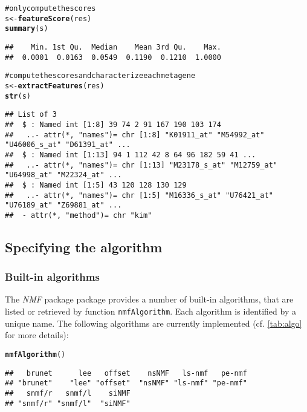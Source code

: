 \documentclass[a4paper]{article}\usepackage{graphicx, color}
\makeatletter
\newcommand{\hlfunctioncall}[1]{\textcolor[rgb]{0.501960784313725,0,0.329411764705882}{\textbf{#1}}}%
\newcommand{\hlcomment}[1]{\textcolor[rgb]{0.180392156862745,0.6,0.341176470588235}{#1}}%
\newenvironment{kframe}{%
 \def\at@end@of@kframe{}%
 \ifinner\ifhmode%
  \def\at@end@of@kframe{\end{minipage}}%
  \begin{minipage}{\columnwidth}%
 \fi\fi%
 \def\FrameCommand##1{\hskip\@totalleftmargin \hskip-\fboxsep
 \colorbox{shadecolor}{##1}\hskip-\fboxsep
     \hskip-\linewidth \hskip-\@totalleftmargin \hskip\columnwidth}%
 \MakeFramed {\advance\hsize-\width
   \@totalleftmargin\z@ \linewidth\hsize
   \@setminipage}}%
 {\par\unskip\endMakeFramed%
 \at@end@of@kframe}
\newenvironment{knitrout}{}{} %
\let\code=\texttt
\newcommand{\pkgname}[1]{\textit{#1}\xspace}
\newcommand{\Rpkg}[1]{\pkgname{#1} package\xspace}
\newcommand{\nmfpack}{\Rpkg{NMF}}
\makeatother
\begin{document}
\begin{knitrout}
\color{fgcolor}\begin{kframe}
\begin{alltt}
\hlcomment{# only compute the scores}
s <- \hlfunctioncall{featureScore}(res)
\hlfunctioncall{summary}(s)
\end{alltt}
\begin{verbatim}
##    Min. 1st Qu.  Median    Mean 3rd Qu.    Max. 
##  0.0001  0.0163  0.0549  0.1190  0.1210  1.0000
\end{verbatim}
\begin{alltt}

\hlcomment{# compute the scores and characterize each metagene}
s <- \hlfunctioncall{extractFeatures}(res)
\hlfunctioncall{str}(s)
\end{alltt}
\begin{verbatim}
## List of 3
##  $ : Named int [1:8] 39 74 2 91 167 190 103 174
##   ..- attr(*, "names")= chr [1:8] "K01911_at" "M54992_at" "U46006_s_at" "D61391_at" ...
##  $ : Named int [1:13] 94 1 112 42 8 64 96 182 59 41 ...
##   ..- attr(*, "names")= chr [1:13] "M23178_s_at" "M12759_at" "U64998_at" "M22324_at" ...
##  $ : Named int [1:5] 43 120 128 130 129
##   ..- attr(*, "names")= chr [1:5] "M16336_s_at" "U76421_at" "U76189_at" "Z69881_at" ...
##  - attr(*, "method")= chr "kim"
\end{verbatim}
\end{kframe}
\end{knitrout}


\subsection{Specifying the algorithm}\label{sec:algo}

\subsubsection{Built-in algorithms}
The \nmfpack package provides a number of built-in algorithms, that are listed or retrieved by function \code{nmfAlgorithm}. 
Each algorithm is identified by a unique name.
The following algorithms are currently implemented (cf. \cref{tab:algo} for more details):

\begin{knitrout}
\color{fgcolor}\begin{kframe}
\begin{alltt}
\hlfunctioncall{nmfAlgorithm}()
\end{alltt}
\begin{verbatim}
##   brunet      lee   offset    nsNMF   ls-nmf   pe-nmf 
## "brunet"    "lee" "offset"  "nsNMF" "ls-nmf" "pe-nmf" 
##   snmf/r   snmf/l    siNMF 
## "snmf/r" "snmf/l"  "siNMF"
\end{verbatim}
\end{kframe}
\end{knitrout}
\end{document}
